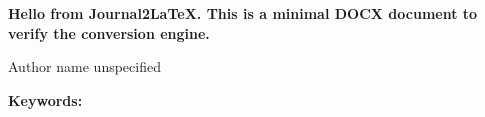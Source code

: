 \documentclass{default}
\begin{document}
\begin{center}
  {\LARGE\bfseries Hello from Journal2LaTeX. This is a minimal DOCX document to verify the conversion engine.\par}
  \vspace{1em}
  {\normalsize Author name unspecified\par}
  \vspace{0.5em}
  {\small \par}
\end{center}
\vspace{1em}

\begin{abstract}

\end{abstract}

\noindent\textbf{Keywords:} 
\vspace{1em}
\end{document}
